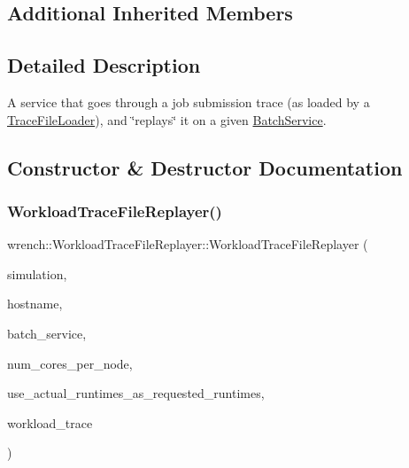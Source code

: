 \subsection*{Additional Inherited Members}


\subsection{Detailed Description}
A service that goes through a job submission trace (as loaded by a \hyperlink{classwrench_1_1_trace_file_loader}{Trace\+File\+Loader}), and \char`\"{}replays\char`\"{} it on a given \hyperlink{classwrench_1_1_batch_service}{Batch\+Service}. 

\subsection{Constructor \& Destructor Documentation}
\mbox{\label{classwrench_1_1_workload_trace_file_replayer_abddae61ba16d8d18faf1767051d5c628}} 
\subsubsection{\texorpdfstring{Workload\+Trace\+File\+Replayer()}{WorkloadTraceFileReplayer()}}
{\footnotesize\ttfamily wrench\+::\+Workload\+Trace\+File\+Replayer\+::\+Workload\+Trace\+File\+Replayer (\begin{DoxyParamCaption}\item[{\hyperlink{classwrench_1_1_simulation}{Simulation} $\ast$}]{simulation,  }\item[{std\+::string}]{hostname,  }\item[{\hyperlink{classwrench_1_1_batch_service}{Batch\+Service} $\ast$}]{batch\+\_\+service,  }\item[{unsigned long}]{num\+\_\+cores\+\_\+per\+\_\+node,  }\item[{bool}]{use\+\_\+actual\+\_\+runtimes\+\_\+as\+\_\+requested\+\_\+runtimes,  }\item[{std\+::vector$<$ std\+::tuple$<$ std\+::string, double, double, double, double, unsigned int $>$$>$ \&}]{workload\+\_\+trace }\end{DoxyParamCaption})}




